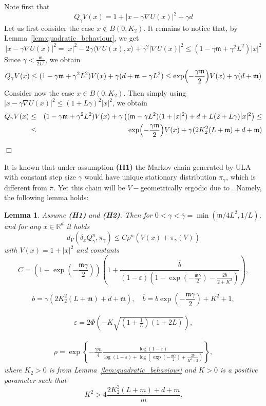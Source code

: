 \documentclass[bj]{imsart}
\def\rset{\mathbb{R}}
\def\rset{\mathbb{R}}
\newcommand{\proofendsign}{$\Box$}
\newtheorem{lem}[thm]{Lemma}
\newenvironment{proof}{{\noindent \bf Proof }}
 {{\hspace*{\fill}\proofendsign\par\bigskip}}
\begin{document}
\begin{proof} 
Note first that
\[
Q_{\gamma}V(x) = 
1+ | x - \gamma \nabla U(x) |^2 + \gamma d
\]
Let us first consider the case $x \notin B(0,K_2)$.  
It remains to notice that, by Lemma~\ref{lem:quadratic_behaviour}, we get
\[
|x - \gamma \nabla U(x) |^2 = |x|^2 - 2\gamma \langle \nabla U(x), x\rangle + \gamma^2 |\nabla U(x)|^2 \leq \left(1 - \gamma \mathfrak{m} + \gamma^2 L^2\right)|x|^2
\]
Since $\gamma < \frac{\mathfrak{m}}{2L^2}$, we obtain
$$
Q_{\gamma}V(x) \leq (1-\gamma \mathfrak{m} + \gamma^2 L^2)V(x) + \gamma (d + \mathfrak{m} - \gamma L^2) \leq \exp\Bigl(-\frac{\gamma \mathfrak{m}}{2}\Bigr)V(x) + \gamma (d + \mathfrak{m})
$$
Consider now the case $x \in B(0,K_2)$. Then simply using $|x-\gamma \nabla U(x)|^2 \leq (1+L\gamma)^2|x|^2$, we obtain
\begin{eqnarray*}
Q_{\gamma}V(x) &\leq & (1-\gamma \mathfrak{m} + \gamma^2 L^2)V(x) + \gamma\left((\mathfrak{m} - \gamma L^2)(1+|x|^2) + d + L(2+L\gamma)|x|^2\right) \leq
\\
&\leq & \exp\Bigl(-\frac{\gamma \mathfrak{m}}{2}\Bigr)V(x) + \gamma(2K_2^2(L+\mathfrak{m}) + d + \mathfrak{m})
\end{eqnarray*}
\end{proof}

It is known that under assumption {\bf (H1)} the Markov chain generated by ULA with constant step size $\gamma$ would have unique stationary distribution $\pi_\gamma$, which is different from $\pi$. Yet this chain will be $V-$geometrically ergodic due to \cite[Theorem~19.4.1]{moulines2018}. Namely, the following lemma holds:

\begin{lem}
\label{lem:v_ergodicity}
 Assume  {\bf (H1)} and {\bf (H2)}. Then for $0 < \gamma < \overline{\gamma}= \min(\mathfrak{m} / 4L^2,1/L)$, and for any $x \in \rset^d$  it holds
$$
d_V(\delta_xQ_{\gamma}^{n},\pi_\gamma) \leq C\rho^{ n}\left(V(x) + \pi_\gamma(V)\right)
$$
with $V(x) = 1 + |x|^2$ and constants
$$
C = \left(1 + \exp{\left(-\frac{\mathfrak{m}\gamma}{2}\right)}\right)\left(1+\frac{\overline{b}}{(1-\varepsilon)(1-\exp{\left(-\frac{\mathfrak{m}\gamma}{2}\right)} - \frac{2b}{2+K^2})}\right),
$$



$$
b = \gamma(2K_2^2(L+\mathfrak{m}) + d + \mathfrak{m}), \quad \overline{b} = b\exp{\left(-\frac{\mathfrak{m}\gamma}{2}\right)} + K^2 + 1, 
$$

\begin{eqnarray*}
\varepsilon = 2\Phi\left(-K\sqrt{\left(1+\frac{1}{L}\right)\left(1 + 2L\right)}\right),
\end{eqnarray*}

\begin{eqnarray}
\label{eq:rho-ula}
\rho = \exp\left\{-\frac{\gamma m}{4}\frac{\log{(1-\varepsilon)}}{\log{(1-\varepsilon)} + \log{(\exp{\left(-\frac{\mathfrak{m}\gamma}{2}\right)} + \frac{2b}{K^2+2})}}\right\},
\end{eqnarray}
where $K_2 > 0$ is from Lemma~\ref{lem:quadratic_behaviour} and $K>0$ is a positive parameter such that 
$$
K^2 > 4\frac{2K_2^2(L+m) + d + m}{m}.
$$
\end{lem}
\end{document}
